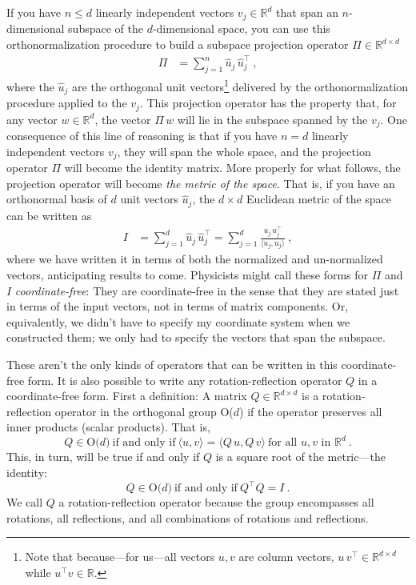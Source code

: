 \documentclass{article}
\newcommand{\inner}[2]{\langle{#1},{#2}\rangle}
\begin{document}
If you have $n\leq d$ linearly independent vectors $v_j\in\mathbb{R}^d$ that span an $n$-dimensional subspace of the $d$-dimensional space, you can use this orthonormalization procedure to build a subspace projection operator $\Pi\in\mathbb{R}^{d\times d}$
\begin{align}
    \Pi &= \sum_{j=1}^n \hat{u}_j\,\hat{u}_j^\top ~,
\end{align}
where the $\hat{u}_j$ are the orthogonal unit vectors\footnote{Note that because---for us---all vectors $u,v$ are column vectors, $u\,v^\top\in\mathbb{R}^{d\times d}$ while $u^\top v\in\mathbb{R}$.} delivered by the orthonormalization procedure applied to the $v_j$.
This projection operator has the property that, for any vector $w\in\mathbb{R}^d$, the vector $\Pi\,w$ will lie in the subspace spanned by the $v_j$.
One consequence of this line of reasoning is that if you have $n=d$ linearly independent vectors $v_j$, they will span the whole space, and the projection operator $\Pi$ will become the identity matrix.
More properly for what follows, the projection operator will become \emph{the metric of the space}.
That is, if you have an orthonormal basis of $d$ unit vectors $\hat{u}_j$, the $d\times d$ Euclidean metric of the space can be written as
\begin{align}
    I &= \sum_{j=1}^d \hat{u}_j\,\hat{u}_j^\top = \sum_{j=1}^d \frac{u_j\,u_j^\top}{\inner{u_j}{u_j}} ~,
\end{align}
where we have written it in terms of both the normalized and un-normalized vectors, anticipating results to come.
Physicists might call these forms for $\Pi$ and $I$ \emph{coordinate-free}:
They are coordinate-free in the sense that they are stated just in terms of the input vectors, not in terms of matrix components.
Or, equivalently, we didn't have to specify my coordinate system when we constructed them; we only had to specify the vectors that span the subspace.

These aren't the only kinds of operators that can be written in this coordinate-free form.
It is also possible to write any rotation-reflection operator $Q$ in a coordinate-free form.
First a definition: A matrix $Q\in\mathbb{R}^{d\times d}$ is a rotation-reflection operator in the orthogonal group O($d$) if the operator preserves all inner products (scalar products).
That is,
\begin{equation}
    Q \in \mbox{O($d$)} ~ \mbox{if and only if} ~ \inner{u}{v}=\inner{Q\,u}{Q\,v} ~ \mbox{for all $u,v$ in $\mathbb{R}^d$} ~ .
\end{equation}
This, in turn, will be true if and only if $Q$ is a square root of the metric---the identity:
\begin{equation}
    Q \in \mbox{O($d$)} ~ \mbox{if and only if} ~ Q^\top Q=I ~ .
\end{equation}
We call $Q$ a rotation-reflection operator because the group encompasses all rotations, all reflections, and all combinations of rotations and reflections.
\end{document}
